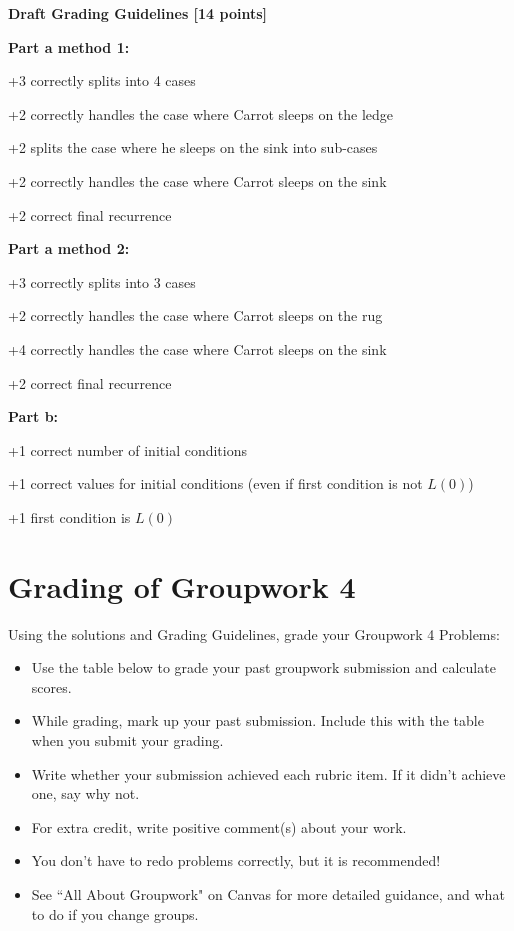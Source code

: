 \documentclass[12pt]{exam}
\newcommand{\prevhwnum}{4}
\begin{document}
\begin{solution}
\textbf{Draft Grading Guidelines [14 points]}

\textbf{Part a method 1:}
\begin{guidelines}
    \item +3 correctly splits into 4 cases
    \item +2 correctly handles the case where Carrot sleeps on the ledge
    \item +2 splits the case where he sleeps on the sink into sub-cases
    \item +2 correctly handles the case where Carrot sleeps on the sink
    \item +2 correct final recurrence
\end{guidelines}
\textbf{Part a method 2:}
\begin{guidelines}
    \item +3 correctly splits into 3 cases
    \item +2 correctly handles the case where Carrot sleeps on the rug
    \item +4 correctly handles the case where Carrot sleeps on the sink
    \item +2 correct final recurrence
\end{guidelines}
\textbf{Part b:}
\begin{guidelines}
    \item +1 correct number of initial conditions
    \item +1 correct values for initial conditions (even if first condition is not $L(0)$)
    \item +1 first condition is $L(0)$
\end{guidelines}
\end{solution}




\pagebreak
\section*{Grading of Groupwork \prevhwnum{}}
Using the solutions and Grading Guidelines, grade your Groupwork \prevhwnum{} Problems:
\begin{itemize}
    \item Use the table below to grade your past groupwork submission and calculate scores.
    \item While grading, mark up your past submission. Include this with the table when you submit your grading.
    \item Write whether your submission achieved each rubric item. If it didn't achieve one, say why not.
    \item For extra credit, write positive comment(s) about your work.
    \item You don't have to redo problems correctly, but it is recommended!
    \item See ``All About Groupwork" on Canvas for more detailed guidance, and what to do if you change groups.
\end{itemize}
\end{document}
